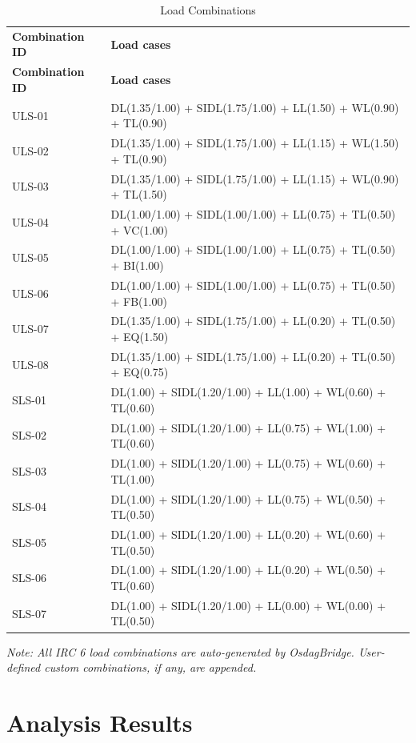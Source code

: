 \documentclass[12pt,a4paper]{report}
\numberwithin{figure}{chapter}
\begin{document}
\vspace{1em}
\begin{longtable}{|C{5.56cm}|L{9.02cm}|}
\caption{Load Combinations}\\
\hline
\textbf{Combination ID} & \textbf{Load cases} \\
\hline
\endfirsthead
\hline
\textbf{Combination ID} & \textbf{Load cases} \\
\hline
\endhead
ULS-01 & DL(1.35/1.00) + SIDL(1.75/1.00) + LL(1.50) + WL(0.90) + TL(0.90) \\
\hline
ULS-02 & DL(1.35/1.00) + SIDL(1.75/1.00) + LL(1.15) + WL(1.50) + TL(0.90) \\
\hline
ULS-03 & DL(1.35/1.00) + SIDL(1.75/1.00) + LL(1.15) + WL(0.90) + TL(1.50) \\
\hline
ULS-04 & DL(1.00/1.00) + SIDL(1.00/1.00) + LL(0.75) + TL(0.50) + VC(1.00) \\
\hline
ULS-05 & DL(1.00/1.00) + SIDL(1.00/1.00) + LL(0.75) + TL(0.50) + BI(1.00) \\
\hline
ULS-06 & DL(1.00/1.00) + SIDL(1.00/1.00) + LL(0.75) + TL(0.50) + FB(1.00) \\
\hline
ULS-07 & DL(1.35/1.00) + SIDL(1.75/1.00) + LL(0.20) + TL(0.50) + EQ(1.50) \\
\hline
ULS-08 & DL(1.35/1.00) + SIDL(1.75/1.00) + LL(0.20) + TL(0.50) + EQ(0.75) \\
\hline
SLS-01 & DL(1.00) + SIDL(1.20/1.00) + LL(1.00) + WL(0.60) + TL(0.60) \\
\hline
SLS-02 & DL(1.00) + SIDL(1.20/1.00) + LL(0.75) + WL(1.00) + TL(0.60) \\
\hline
SLS-03 & DL(1.00) + SIDL(1.20/1.00) + LL(0.75) + WL(0.60) + TL(1.00) \\
\hline
SLS-04 & DL(1.00) + SIDL(1.20/1.00) + LL(0.75) + WL(0.50) + TL(0.50) \\
\hline
SLS-05 & DL(1.00) + SIDL(1.20/1.00) + LL(0.20) + WL(0.60) + TL(0.50) \\
\hline
SLS-06 & DL(1.00) + SIDL(1.20/1.00) + LL(0.20) + WL(0.50) + TL(0.60) \\
\hline
SLS-07 & DL(1.00) + SIDL(1.20/1.00) + LL(0.00) + WL(0.00) + TL(0.50) \\
\hline
\end{longtable}

\noindent\textit{Note: All IRC 6 load combinations are auto-generated by OsdagBridge. User-defined custom combinations, if any, are appended.}


\chapter{Analysis Results}
\end{document}
